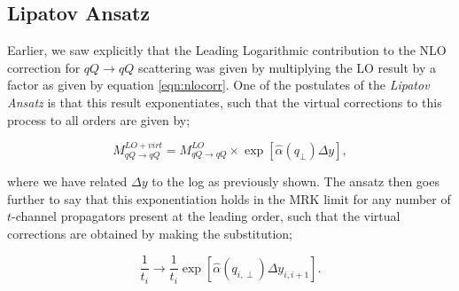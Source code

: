\subsection{Lipatov Ansatz}
Earlier, we saw explicitly that the Leading Logarithmic contribution to the NLO correction for $qQ \to qQ$ scattering was given by multiplying the LO result by a factor as given by equation \ref{eqn:nlocorr}. One of the postulates of the \emph{Lipatov Ansatz} is that this result exponentiates, such that the virtual corrections to this process to all orders are given by;

\begin{equation}
M_{qQ \to qQ}^{LO + virt} = M_{qQ \to qQ}^{LO} \times \exp \left[\hat{\alpha}(q_\perp) \Delta y \right],
\end{equation}

where we have related $\Delta y$ to the log as previously shown. The ansatz then goes further to say that this exponentiation holds in the MRK limit for any number of $t$-channel propagators present at the leading order, such that the virtual corrections are obtained by making the substitution;

\begin{equation}
\frac{1}{t_i} \to \frac{1}{t_i} \exp \left[\hat{\alpha}(q_{i,\perp}) \Delta y_{i,i+1} \right].
\end{equation}

